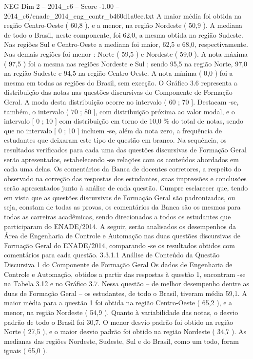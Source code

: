 \begin{textsample}{NEG Dim 2 – 2014\_c6 – Score -1.00 – 2014\_c6/enade\_2014\_eng\_contr\_b460d1a0ee.txt}
A maior média foi obtida na região Centro-Oeste ( 60,8 ), e a menor, na região Nordeste ( 50,9 ).
A mediana de todo o Brasil, neste componente, foi 62,0, a mesma obtida na região Sudeste.
Nas regiões Sul e Centro-Oeste a mediana foi maior, 62,5 e 68,0, respectivamente.
Nas demais regiões foi menor : Norte ( 59,5 ) e Nordeste ( 59,0 ).
A nota máxima ( 97,5 ) foi a mesma nas regiões Nordeste e Sul ; sendo 95,5 na região Norte, 97,0 na região Sudeste e 94,5 na região Centro-Oeste.
A nota mínima ( 0,0 ) foi a mesma em todas as regiões do Brasil, sem exceção.
O Gráfico 3.6 representa a distribuição das notas nas questões discursivas do Componente de Formação Geral.
A moda desta distribuição ocorre no intervalo ( 60 ; 70 ].
Destacam -se, também, o intervalo ( 70 ; 80 ], com distribuição próxima ao valor modal, e o intervalo [ 0 ; 10 ] com distribuição em torno de 10,0 \% do total de notas, sendo que no intervalo [ 0 ; 10 ] incluem -se, além da nota zero, a frequência de estudantes que deixaram este tipo de questão em branco.
Na sequência, os resultados verificados para cada uma das questões discursivas de Formação Geral serão apresentados, estabelecendo -se relações com os conteúdos abordados em cada uma delas.
Os comentários da Banca de docentes corretores, a respeito do observado na correção das respostas dos estudantes, suas impressões e conclusões serão apresentados junto à análise de cada questão.
Cumpre esclarecer que, tendo em vista que as questões discursivas de Formação Geral são padronizadas, ou seja, constam de todas as provas, os comentários da Banca são os mesmos para todas as carreiras acadêmicas, sendo direcionados a todos os estudantes que participaram do ENADE/2014.
A seguir, serão analisados os desempenhos da Área de Engenharia de Controle e Automação nas duas questões discursivas de Formação Geral do ENADE/2014, comparando -se os resultados obtidos com comentários para cada questão. 3.3.1.1 Análise de Conteúdo da Questão Discursiva 1 do Componente de Formação Geral Os dados de Engenharia de Controle e Automação, obtidos a partir das respostas à questão 1, encontram -se na Tabela 3.12 e no Gráfico 3.7.
Nessa questão – de melhor desempenho dentre as duas de Formação Geral – os estudantes, de todo o Brasil, tiveram média 59,1.
A maior média para a questão 1 foi obtida na região Centro-Oeste ( 65,2 ), e a menor, na região Nordeste ( 54,9 ).
Quanto à variabilidade das notas, o desvio padrão de todo o Brasil foi 30,7.
O menor desvio padrão foi obtido na região Norte ( 27,5 ), e o maior desvio padrão foi obtido na região Nordeste ( 34,7 ).
As medianas das regiões Nordeste, Sudeste, Sul e do Brasil, como um todo, foram iguais ( 65,0 ).

\end{textsample}
